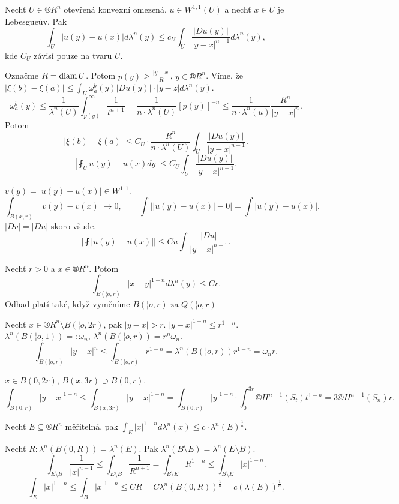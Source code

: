 \documentclass[12pt]{article}					%
\begin{document}
\begin{dusledek}
	Nechť $U \in ®R^n$ otevřená konvexní omezená, $u \in W^{1, 1}(U)$ a nechť $x \in U$ je Lebesgueův. Pak
	$$ \int_U |u(y) - u(x)| dλ^n(y) ≤ c_U \int_U \frac{|Du(y)|}{|y - x|^{n-1}} dλ^n(y), $$
	kde $C_U$ závisí pouze na tvaru $U$.

	\begin{dukazin}
		Označme $R = \operatorname{diam} U$. Potom $p(y) ≥ \frac{|y - x|}{R}$, $y \in ®R^n$. Víme, že $|ξ(b) - ξ(a)| ≤ \int_U ω_a^b(y) |Du(y)|·|y - z| dλ^n(y)$.
		$$ ω_a^b(y) ≤ \frac{1}{λ^n(U)} \int_{p(y)}^∞ \frac{1}{t^{n+1}} = \frac{1}{n·λ^n(U)} [p(y)]^{-n} ≤ \frac{1}{n·λ^n(u)} \frac{R^n}{|y - x|^n}. $$
		Potom
		$$ |ξ(b) - ξ(a)| ≤ C_U · \frac{R^n}{n·λ^n(U)} \int_U \frac{|Du(y)|}{|y - x|^{n-1}}. $$
		$$ |\fint_U u(y) - u(x) dy| ≤ C_U \int_U \frac{|Du(y)|}{|y - x|^{n-1}}. $$

		$v(y) = |u(y) - u(x)| \in W^{1, 1}$.
		$$ \int_{B(x, r)} | v(y) - v(x) | \rightarrow 0, \qquad \int \left| |u(y) - u(x)| - 0\right| = \int |u(y) - u(x)|. $$
		$|Dv| = |Du|$ skoro všude.
		$$ \left| \fint |u(y) - u(x)| \right| ≤ Cu \int \frac{|Du|}{|y - x|^{n-1}}. $$
	\end{dukazin}
\end{dusledek}

\begin{lemma}
	Nechť $r > 0$ a $x \in ®R^n$. Potom
	$$ \int_{B(¦o, r)} |x - y|^{1 - n} dλ^n(y) ≤ Cr. $$
	Odhad platí také, když vyměníme $B(¦o, r)$ za $Q(¦o, r)$

	\begin{dukazin}
		Nechť $x \in ®R^n \setminus B(¦o, 2r)$, pak $|y - x| > r$. $|y - x|^{1 - n} ≤ r^{1 - n}$. $λ^n (B(¦o, 1)) =: ω_n$, $λ^n(B(¦o, r)) = r^n ω_n$.
		$$ \int_{B(¦o, r)} |y - x|^n ≤ \int_{B(¦o, r)} r^{1 - n} = λ^n(B(¦o, r)) r^{1 - n} = ω_n r. $$

		$x \in B(0, 2r)$, $B(x, 3r) \supset B(0, r)$.
		$$ \int_{B(0, r)} |y - x|^{1 - n} ≤ \int_{B(x, 3r)} |y - x|^{1 - n} = \int_{B(0, r)} |y|^{1 - n}·\int_0^{3r} ©H^{n - 1}(S_t) t^{1 - n} = 3 ©H^{n - 1} (S_n) r. $$
	\end{dukazin}
\end{lemma}

\begin{lemma}
	Nechť $E \subseteq ®R^n$ měřitelná, pak $\int_E |x|^{1 - n} dλ^n(x) ≤ c·λ^n(E)^{\frac{1}{n}}$.

	\begin{dukazin}
		Nechť $R: λ^n(B(0, R)) = λ^n(E)$. Pak $λ^n(B \setminus E) = λ^n(E \setminus B)$.
		$$ \int_{E \setminus B} \frac{1}{|x|^{n-1}} ≤ \int_{E \setminus B} \frac{1}{R^{n+1}} = \int_{B \setminus E} R^{1 - n} ≤ \int_{B \setminus E} |x|^{1 - n}. $$
		$$ \int_E |x|^{1 - n} ≤ \int_B |x|^{1 - n} ≤ C R = C λ^n(B(0, R))^{\frac{1}{n}} = c(λ(E))^{\frac{1}{n}}. $$
	\end{dukazin}
\end{lemma}
\end{document}
